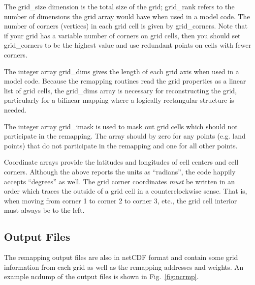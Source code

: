 \documentclass[12pt]{report}
\begin{document}
The grid\_size dimension is the total size of the grid; grid\_rank
refers to the number of dimensions the grid array would have
when used in a model code.  The number of corners (vertices) in
each grid cell is given by grid\_corners.  Note that if your
grid has a variable number of corners on grid cells, then you
should set grid\_corners to be the highest value and use
redundant points on cells with fewer corners.

The integer array grid\_dims gives the length of each
grid axis when used in a model code.  Because the remapping
routines read the grid properties as a linear list of
grid cells, the grid\_dims array is necessary for
reconstructing the grid, particularly for a bilinear mapping
where a logically rectangular structure is needed.

The integer array grid\_imask is used to mask out grid cells
which should not participate in the remapping.  The array
should by zero for any points (e.g. land points) that do
not participate in the remapping and one for all other points.

Coordinate arrays provide the latitudes and longitudes of
cell centers and cell corners.  Although the above reports
the units as ``radians'', the code happily accepts ``degrees''
as well.  The grid corner coordinates {\em must} be
written in an order which traces the outside of a grid
cell in a counterclockwise sense.  That is, when moving
from corner 1 to corner 2 to corner 3, etc., the grid
cell interior must always be to the left.

\subsection{Output Files}

The remapping output files are also in netCDF format
and contain some grid information from each grid
as well as the remapping addresses and weights.  An example
ncdump of the output files is shown in Fig.~\ref{fig:ncrmp}.
\end{document}
